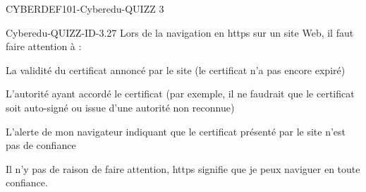 \documentclass[12pt]{article}
\begin{document}
\begin{quiz}{CYBERDEF101-Cyberedu-QUIZZ 3}
\begin{multi}[multiple=true]{Cyberedu-QUIZZ-ID-3.27}
	Lors de la navigation en https sur un site Web, il faut faire attention \`{a} :
\item* La validit\'e du certificat annonc\'e par le site (le certificat n'a pas encore expir\'e)
\item* L'autorit\'e ayant accord\'e le certificat (par exemple, il ne faudrait que le certificat soit auto-sign\'e ou issue d'une autorit\'e non reconnue)
\item* L'alerte de mon navigateur indiquant que le certificat pr\'esent\'e par le site n'est pas de confiance
\item Il n'y pas de raison de faire attention,  https  signifie que je peux naviguer en toute confiance.
\end{multi}


  \end{quiz}
   
\end{document}
